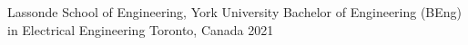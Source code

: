


\begin{cventries}


\cventry
{Lassonde School of Engineering, York University} %
{Bachelor of Engineering (BEng) in Electrical Engineering} %
{Toronto, Canada} %
{2021} %
{ %
\begin{cvitems}
\end{cvitems}
}


\end{cventries}